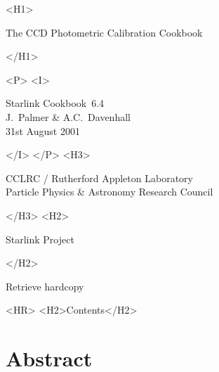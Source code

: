\documentclass[twoside,11pt]{article}
\newcommand{\stardoccategory}  {Starlink Cookbook}
\newcommand{\stardocsource}    {sc\stardocnumber}
\newcommand{\stardocnumber}    {6.4}
\newcommand{\stardocauthors}   {J.~Palmer \& A.C.~Davenhall}
\newcommand{\stardocdate}      {31st August 2001}
\newcommand{\stardoctitle}     {The CCD Photometric Calibration Cookbook}
\newcommand{\htmladdnormallink}[2]{#1}
\newcommand{\htmladdimg}[1]{}
\newcommand{\htmlref}[2]{#1}
\newcommand{\htmladdtonavigation}[1]{}
\newcommand{\xlabel}[1]{}
\newcommand{\latexonlytoc}[0]{\tableofcontents}
\begin{document}
\begin{htmlonly}
   \xlabel{}
   \begin{rawhtml} <H1> \end{rawhtml}
      \stardoctitle\\
   \begin{rawhtml} </H1> \end{rawhtml}


   \begin{rawhtml} <P> <I> \end{rawhtml}
   \stardoccategory\ \stardocnumber \\
   \stardocauthors \\
   \stardocdate
   \begin{rawhtml} </I> </P> <H3> \end{rawhtml}
      \htmladdnormallink{CCLRC}{http://www.cclrc.ac.uk} /
      \htmladdnormallink{Rutherford Appleton Laboratory}
                        {http://www.cclrc.ac.uk/ral} \\
      \htmladdnormallink{Particle Physics \& Astronomy Research Council}
                        {http://www.pparc.ac.uk} \\
   \begin{rawhtml} </H3> <H2> \end{rawhtml}
      \htmladdnormallink{Starlink Project}{http://star-www.rl.ac.uk/}
   \begin{rawhtml} </H2> \end{rawhtml}
   \htmladdnormallink{\htmladdimg{source.gif} Retrieve hardcopy}
      {http://star-www.rl.ac.uk/cgi-bin/hcserver?\stardocsource}\\

  \label{stardoccontents}
  \begin{rawhtml} 
    <HR>
    <H2>Contents</H2>
  \end{rawhtml}
  \newcommand{\latexonlytoc}[0]{}
  \htmladdtonavigation{\htmlref{\htmladdimg{contents_motif.gif}}
        {stardoccontents}}

  \section{\xlabel{abstract}Abstract}
\end{htmlonly}
\end{document}
